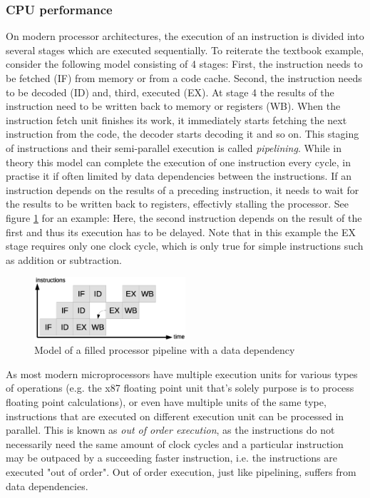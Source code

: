 \subsubsection{CPU performance}
On modern processor architectures, the execution of an instruction is divided into several stages which are executed sequentially. To reiterate the textbook example, consider the following model consisting of 4 stages: First, the instruction needs to be fetched (IF) from memory or from a code cache. Second, the instruction needs to be decoded (ID) and, third, executed (EX). At stage 4 the results of the instruction need to be written back to memory or registers (WB). When the instruction fetch unit finishes its work, it immediately starts fetching the next instruction from the code, the decoder starts decoding it and so on. This staging of instructions and their semi-parallel execution is called \emph{pipelining}. While in theory this model can complete the execution of one instruction every cycle, in practise it if often limited by data dependencies between the instructions. If an instruction depends on the results of a preceding instruction, it needs to wait for the results to be written back to registers, effectivly stalling the processor. See figure \ref{fig:pipeline} for an example: Here, the second instruction depends on the result of the first and thus its execution has to be delayed. Note that in this example the EX stage requires only one clock cycle, which is only true for simple instructions such as addition or subtraction.

\begin{figure}[h]
\begin{center}
\includegraphics[width=0.5\textwidth]{img/pipeline}
\end{center}
\caption{Model of a filled processor pipeline with a data dependency}
\label{fig:pipeline}
\end{figure}

As most modern microprocessors have multiple execution units for various types of operations (e.g. the x87 floating point unit that's solely purpose is to process floating point calculations), or even have multiple units of the same type, instructions that are executed on different execution unit can be processed in parallel. This is known as \emph{out of order execution}, as the instructions do not necessarily need the same amount of clock cycles and a particular instruction may be outpaced by a succeeding faster instruction, i.e. the instructions are executed "out of order". Out of order execution, just like pipelining, suffers from data dependencies.


